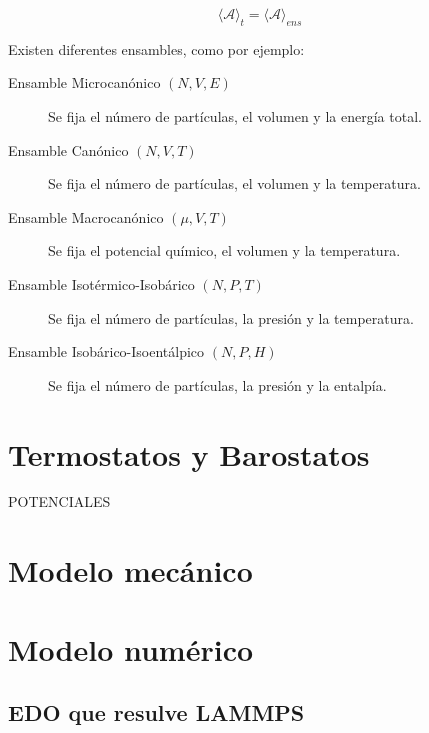 \begin{equation}
\langle \mathbf{\mathcal{A}} \rangle _{t} = \langle \mathbf{\mathcal{A}} \rangle _{ens}
\end{equation}

Existen diferentes ensambles, como por ejemplo:

\begin{description}
	\item[Ensamble Microcanónico $(N,V,E)$] Se fija el número de partículas, el volumen y la energía total.
	\item[Ensamble Canónico $(N,V,T)$] Se fija el número de partículas, el volumen y la temperatura.
	\item[Ensamble Macrocanónico $(\mu,V,T)$] Se fija el potencial químico, el volumen y la temperatura.
	\item[Ensamble Isotérmico-Isobárico $(N,P,T)$] Se fija el número de partículas, la presión y la temperatura.
	\item[Ensamble Isobárico-Isoentálpico $(N,P,H)$] Se fija el número de partículas, la presión y la entalpía.
\end{description}


\section{Termostatos y Barostatos}
\label{S2_3}



POTENCIALES

\section{Modelo mecánico}
\label{S2_4}



\section{Modelo numérico}
\label{S2_5}



\subsection{EDO que resulve LAMMPS}
\label{S2_5_1}